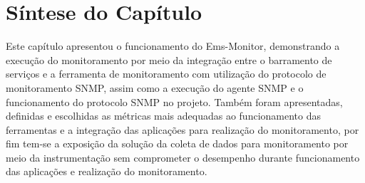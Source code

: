 
\section{Síntese do Capítulo}
\label{sintese4}

Este capítulo apresentou o funcionamento do Ems-Monitor, demonstrando a execução do monitoramento por meio da integração entre o barramento de serviços e a ferramenta de monitoramento com utilização do protocolo de monitoramento \acrshort{SNMP}, assim como a execução do agente \acrshort{SNMP} e o funcionamento do protocolo \acrshort{SNMP} no projeto. Também foram apresentadas, definidas e escolhidas as métricas mais adequadas ao funcionamento das ferramentas e a integração das aplicações para realização do monitoramento, por fim tem-se a exposição da solução da coleta de dados para monitoramento por meio da instrumentação sem comprometer o desempenho durante funcionamento das aplicações e realização do monitoramento. 
